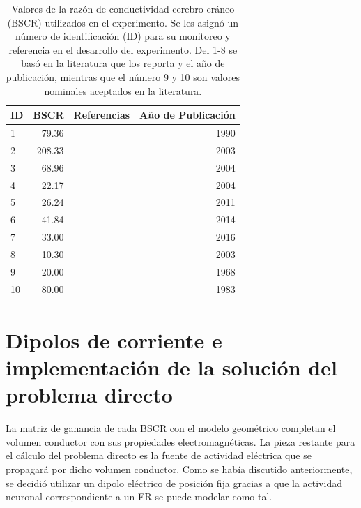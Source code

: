 \begin{table}[p]
	\centering
	\begin{tabular}{lrrr}
		\toprule
		ID & BSCR   & Referencias  & Año de Publicación \\ \midrule
		1  & 79.36  & \cite{Cohen1983} & 1990 \\
		2  & 208.33 & \cite{eriksenVivoHumanHead1990} & 2003 \\
		3  & 68.96  & \cite{gonalvesVivoMeasurementBrain2003} & 2004 \\
		4  & 22.17  & \cite{Baysal2004} & 2004 \\
		5  & 26.24  & \cite{Gutierrez2004} & 2011 \\
		6  & 41.84  & \cite{Dannhauer2011} & 2014 \\
		7  & 33.00  & \cite{aydinCombiningEEGMEG2014a} & 2016 \\
		8  & 10.30  & \cite{acarHighresolutionEEGSource2016} & 2003 \\
		9  & 20.00  & \cite{hoekemaMeasurementConductivitySkull2003} & 1968 \\
		10 & 80.00  & \cite{Rush1968} & 1983 \\ \bottomrule
	\end{tabular}
	\caption{Valores de la razón de conductividad cerebro-cráneo (BSCR) utilizados en el experimento. Se les asignó un número de identificación (ID) para su monitoreo y referencia en el desarrollo del experimento. Del 1-8 se basó en la literatura que los reporta y el año de publicación, mientras que el número 9 y 10 son valores nominales aceptados en la literatura.}
	\label{tab:bscr}
\end{table}

\section{Dipolos de corriente e implementación de la solución del problema directo}
\label{sec:methodology:direct_solved}

La matriz de ganancia de cada BSCR con el modelo geométrico completan el volumen conductor con sus propiedades electromagnéticas.
La pieza restante para el cálculo del problema directo es la fuente de actividad eléctrica que se propagará por dicho volumen conductor.
Como se había discutido anteriormente, se decidió utilizar un dipolo eléctrico de posición fija gracias a que la actividad neuronal correspondiente a un ER se puede modelar como tal. 

